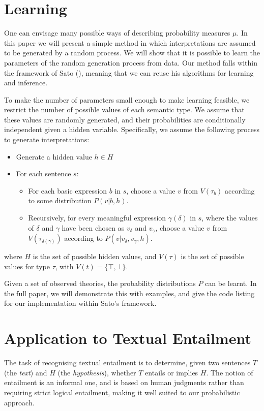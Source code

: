 \documentclass[letterpaper]{article}
\begin{document}
\section{Learning}

One can envisage many possible ways of describing probability measures
$\mu$. In this paper we will present a simple method in which
interpretations are assumed to be generated by a random process. We
will show that it is possible to learn the parameters of the random
generation process from data. Our method falls within the framework of
Sato (\citeyear{Sato:95}), meaning that we can reuse his algorithms
for learning and inference.

To make the number of parameters small enough to make learning
feasible, we restrict the number of possible values of each semantic
type. We assume that these values are randomly generated, and their
probabilities are conditionally independent given a hidden
variable. Specifically, we assume the following process to generate
interpretations:
\begin{itemize}
\item Generate a hidden value $h\in H$
\item For each sentence $s$:
\begin{itemize}
\item For each basic expression $b$ in $s$, choose a value $v$ from
  $V(\tau_b)$ according to some distribution $P(v|b,h)$.
\item Recursively, for every meaningful expression $\gamma(\delta)$ in
  $s$, where the values of $\delta$ and $\gamma$ have been chosen as
  $v_\delta$ and $v_\gamma$, choose a value $v$ from
  $V(\tau_{\delta(\gamma)})$ according to $P(v|v_\delta, v_\gamma,
  h)$.
\end{itemize}
\end{itemize}
where $H$ is the set of possible hidden values, and $V(\tau)$ is the
set of possible values for type $\tau$, with $V(t) = \{\top, \bot\}$.

Given a set of observed theories, the probability distributions $P$
can be learnt. In the full paper, we will demonstrate this with
examples, and give the code listing for our implementation within
Sato's framework.

\section{Application to Textual Entailment}

The task of recognising textual entailment \cite{Dagan:05} is to
determine, given two sentences $T$ (the \emph{text}) and $H$ (the
\emph{hypothesis}), whether $T$ entails or implies $H$. The notion of
entailment is an informal one, and is based on human judgments rather
than requiring strict logical entailment, making it well suited to our
probabilistic approach.
\end{document}
